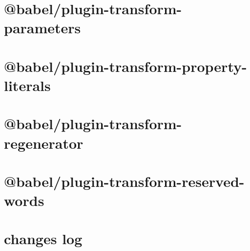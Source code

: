\documentclass[twoside]{book}
\newcommand{\+}{\discretionary{\mbox{\scriptsize$\hookleftarrow$}}{}{}}
\begin{document}
\chapter{@babel/plugin-\/transform-\/parameters}
\label{md__c___users_vaishnavi_jadhav__desktop__developer_code_mean_stack_example_client_node_modules__9d610aa2675260158cd6876344bd49ca}

\chapter{@babel/plugin-\/transform-\/property-\/literals}
\label{md__c___users_vaishnavi_jadhav__desktop__developer_code_mean_stack_example_client_node_modules__55e5973596db03d975588aff7221efbc}

\chapter{@babel/plugin-\/transform-\/regenerator}
\label{md__c___users_vaishnavi_jadhav__desktop__developer_code_mean_stack_example_client_node_modules__7e8cef7b3fd5b1af96b84b14781331d2}

\chapter{@babel/plugin-\/transform-\/reserved-\/words}
\label{md__c___users_vaishnavi_jadhav__desktop__developer_code_mean_stack_example_client_node_modules__b25da551662e89f599b70a02e0eb2274}

\chapter{changes log}
\label{md__c___users_vaishnavi_jadhav__desktop__developer_code_mean_stack_example_client_node_modules__27092ac08f9b0efe6ada49a96087dd6d}

\end{document}
